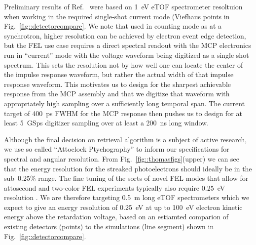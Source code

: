 Preliminary results of Ref.~\cite{Nick2018} were based on 1~eV eTOF spectrometer resoltuion when working in the required single-shot current mode (Viefhaus points in Fig.~\ref{fig::detectorcompare}.
We note that used in counting mode as at a synchrotron, higher resolution can be achieved by electron event edge detection, but the FEL use case requires a direct spectral readout with the MCP electronics run in ``current'' mode with the voltage waveform being digitized as a single shot spectrum.
This sets the resolution not by how well one can locate the center of the impulse response waveform, but rather the actual width of that impulse response waveform.
This motivates us to design for the sharpest achievable response from the MCP assembly and that we digitize that waveform with appropriately high sampling over a sufficiently long temporal span.
The current target of 400~ps FWHM for the MCP response then pushes us to design for at least 5~GSps digitizer sampling over at least a 200~ns long window.

Although the final decision on retrieval algorithm is a subject of active research, we use so called ``Attoclock Ptychography'' \cite{Thomas2018} to inform our specifications for spectral and angular resolution.
From Fig.~\ref{fig::thomasfigs}(upper) we can see that the energy resolution for the streaked photoelectrons should ideally be in the sub~0.25\% range.
The fine tuning of the sorts of novel FEL modes that allow for attosecond \cite{xLEAP} and two-color \cite{LutmanFreshSlice2016} FEL experiments typically also require 0.25~eV resolution \cite{AlbertoPrivate}.
We are therefore targeting 0.5~m long eTOF spectrometers which we expect to give an energy resolution of 0.25~eV at up to 100~eV electron kinetic energy above the retardation voltage, based on an estiamted comparion of existing detectors (points) to the simulations (line segment) shown in Fig.~\ref{fig::detectorcompare}.

